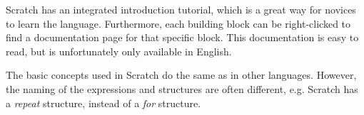 \begin{description}[style=nextline]
\item[Documentation] Scratch has an integrated introduction tutorial, which is a great way for novices to learn the language. Furthermore, each building block can be right-clicked to find a documentation page for that specific block. This documentation is easy to read, but is unfortunately only available in English.
\item[Uniformity] The basic concepts used in Scratch do the same as in other languages. However, the naming of the expressions and structures are often different, e.g. Scratch has a \emph{repeat} structure, instead of a \emph{for} structure.
\end{description}